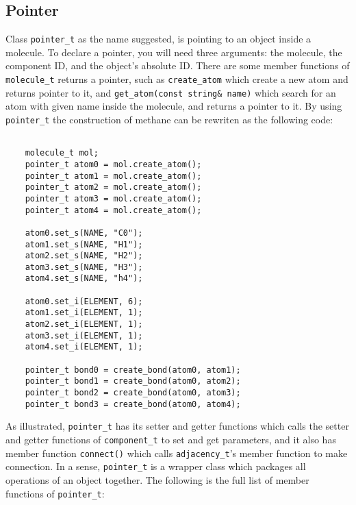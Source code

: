 \documentclass[letterpaper]{book}
\begin{document}
\subsection{Pointer}

   Class \lstinline$pointer_t$ as the name suggested, is pointing to an object inside a molecule. 
To declare a pointer, you will need three arguments: the molecule, the component ID, and the object's absolute
ID. There are some member functions of \lstinline$molecule_t$ returns a pointer, such as 
\lstinline$create_atom$ which create a new atom and returns pointer to it, and 
\lstinline$get_atom(const string& name)$ which search for an atom with given name inside the molecule,
and returns a pointer to it. By using \lstinline$pointer_t$ the construction of methane can be
rewriten as the following code:

\begin{lstlisting}

    molecule_t mol;
    pointer_t atom0 = mol.create_atom();
    pointer_t atom1 = mol.create_atom();
    pointer_t atom2 = mol.create_atom();
    pointer_t atom3 = mol.create_atom();
    pointer_t atom4 = mol.create_atom();

    atom0.set_s(NAME, "C0");
    atom1.set_s(NAME, "H1");
    atom2.set_s(NAME, "H2");
    atom3.set_s(NAME, "H3");
    atom4.set_s(NAME, "h4");

    atom0.set_i(ELEMENT, 6);
    atom1.set_i(ELEMENT, 1);
    atom2.set_i(ELEMENT, 1);
    atom3.set_i(ELEMENT, 1);
    atom4.set_i(ELEMENT, 1);

    pointer_t bond0 = create_bond(atom0, atom1);
    pointer_t bond1 = create_bond(atom0, atom2);
    pointer_t bond2 = create_bond(atom0, atom3);
    pointer_t bond3 = create_bond(atom0, atom4);

\end{lstlisting}

  As illustrated, \lstinline$pointer_t$ has its setter and getter functions which calls the
setter and getter functions of \lstinline$component_t$ to set and get parameters, and it
also has member function \lstinline$connect()$ which calls \lstinline$adjacency_t$'s member
function to make connection. In a sense, \lstinline$pointer_t$ is a wrapper class which
packages all operations of an object together. The following is the full list of member 
functions of \lstinline$pointer_t$:
\end{document}

